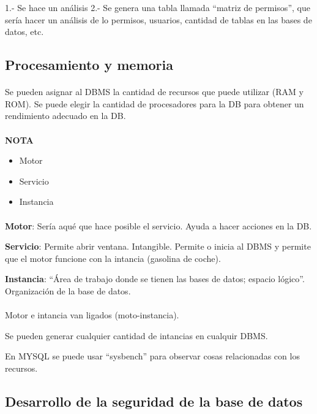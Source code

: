 \documentclass{article}
\begin{document}
1.- Se hace un análisis
2.- Se genera una tabla llamada ``matriz de permisos'', que sería hacer un
análisis de lo permisos, usuarios, cantidad de tablas en las bases de datos, etc.

\subsection{Procesamiento y memoria}

\paragraph{}
Se pueden asignar al DBMS la cantidad de recursos que puede utilizar (RAM y
ROM).
Se puede elegir la cantidad de procesadores para la DB para obtener un
rendimiento adecuado en la DB.

\paragraph{}
\textbf{NOTA}
\begin{itemize}
	\item
	Motor
	\item
	Servicio
	\item
	Instancia
\end{itemize}

\paragraph{}
\textbf{Motor}: Sería aqué que hace posible el servicio. Ayuda a hacer acciones en la DB.

\textbf{Servicio}: Permite abrir ventana. Intangible. Permite  o inicia al DBMS
y permite que el motor funcione con la intancia (gasolina de coche).

\textbf{Instancia}: ``Área de trabajo donde se tienen las bases de datos; espacio lógico''.
Organización de la base de datos.

\paragraph{}
Motor e intancia van ligados (moto-instancia).

Se pueden generar cualquier cantidad de intancias en cualquir DBMS.

En MYSQL se puede usar ``sysbench'' para observar cosas relacionadas con los
recursos.

\subsection{Desarrollo de la seguridad de la base de datos}
\end{document}
